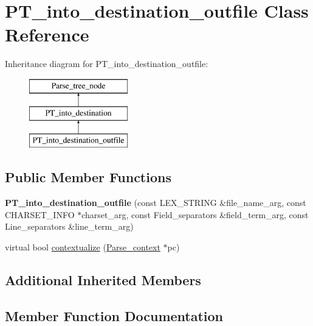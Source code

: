 \hypertarget{classPT__into__destination__outfile}{}\section{P\+T\+\_\+into\+\_\+destination\+\_\+outfile Class Reference}
\label{classPT__into__destination__outfile}
Inheritance diagram for P\+T\+\_\+into\+\_\+destination\+\_\+outfile\+:\begin{figure}[H]
\begin{center}
\leavevmode
\includegraphics[height=3.000000cm]{classPT__into__destination__outfile}
\end{center}
\end{figure}
\subsection*{Public Member Functions}
\begin{DoxyCompactItemize}
\item 
\mbox{\label{classPT__into__destination__outfile_a1de8517adb062618b6c1a45eed681407}} 
{\bfseries P\+T\+\_\+into\+\_\+destination\+\_\+outfile} (const L\+E\+X\+\_\+\+S\+T\+R\+I\+NG \&file\+\_\+name\+\_\+arg, const C\+H\+A\+R\+S\+E\+T\+\_\+\+I\+N\+FO $\ast$charset\+\_\+arg, const Field\+\_\+separators \&field\+\_\+term\+\_\+arg, const Line\+\_\+separators \&line\+\_\+term\+\_\+arg)
\item 
virtual bool \mbox{\hyperlink{classPT__into__destination__outfile_a6cd3dd75a5259d8f8d5a838e8dac586e}{contextualize}} (\mbox{\hyperlink{structParse__context}{Parse\+\_\+context}} $\ast$pc)
\end{DoxyCompactItemize}
\subsection*{Additional Inherited Members}


\subsection{Member Function Documentation}
\mbox{\label{classPT__into__destination__outfile_a6cd3dd75a5259d8f8d5a838e8dac586e}} 
